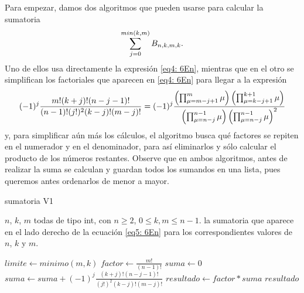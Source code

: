 Para empezar, damos dos algoritmos que pueden
usarse para calcular la sumatoria 
\[
\sum\limits_{j=0}^{min(k,m)}B_{n,k,m,k}.
\] 
Uno de ellos usa
directamente la expresión \eqref{eq4: 6En}, mientras
que en el otro se simplifican los factoriales que
aparecen en \eqref{eq4: 6En} para llegar a la expresión
\[
(-1)^{j} \frac{m! (k+j)!(n-j-1)!}{(n-1)!(j!)^{2}(k-j)!(m-j)!}
= (-1)^{j}
\frac{\left( \prod_{\mu=m-j+1}^{m}{\mu} \right)
\left( \prod_{\mu=k-j+1}^{k+1}{\mu} \right)
}{
\left( \prod_{\mu=n-j}^{n-1}{\mu} \right)
\left( \prod_{\mu=n-j}^{n-1}{\mu} \right)^{2}
}
\]
y, para simplificar aún más los cálculos, el algoritmo
busca qué factores se repiten en el numerador y en el denominador,
para así eliminarlos y sólo calcular el producto de los 
números restantes. Observe que en ambos algoritmos, antes
de realizar la suma se calculan y guardan todos los sumandos
en una lista, pues queremos antes ordenarlos de menor a mayor.


\begin{algorithm}
\caption{sumatoria V1}
\begin{algorithmic}[1] 
\REQUIRE $n$, $k$, $m$ todas de tipo int, con $n \geq 2$, 
$0 \leq k, m \leq n-1$.
\ENSURE la sumatoria que aparece en el lado derecho de la
ecuación \eqref{eq5: 6En}
para los correspondientes valores de $n$, $k$ y $m$.

\STATE $limite \leftarrow minimo(m,k)$
\STATE $factor \leftarrow \frac{m!}{(n-1)!}$
\STATE $suma \leftarrow 0$
\STATE $suma \leftarrow suma + 
(-1)^{j} \frac{(k+j)!(n-j-1)!}{(j!)^{2}(k-j)!(m-j)!}$
\ENDFOR
\STATE $resultado \leftarrow factor*suma$
\RETURN $resultado$
\end{algorithmic}
\end{algorithm}


